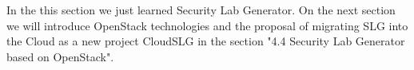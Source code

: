   
In the this section we just learned Security Lab Generator. On the next section we will introduce OpenStack technologies and the proposal of migrating SLG into the Cloud as a new project CloudSLG in the section "4.4 Security Lab Generator based on OpenStack". 


 






% 